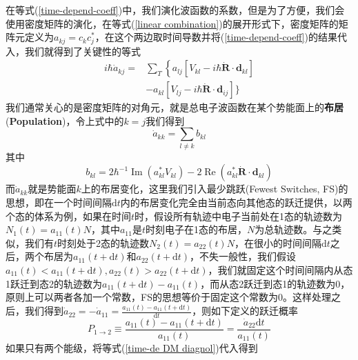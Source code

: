 \documentclass[12pt,a4paper,openany,twoside]{book}
\numberwithin{equation}{section}
\begin{document}
        在等式(\ref{time-depend-coeff})中，我们演化波函数的系数，但是为了方便，我们会使用密度矩阵的演化，在等式(\ref{linear combination})的展开形式下，密度矩阵的矩阵元定义为$a_{kj}=c_k c_j^*$，在这个两边取时间导数并将(\ref{time-depend-coeff})的结果代入，我们就得到了关键性的等式
        \begin{equation}
          \begin{aligned} i \hbar \dot{a}_{k j}=& \sum_{T}\left\{a_{l j}\left[V_{k l}-i \hbar \dot{\mathbf{R}} \cdot \mathbf{d}_{k l}\right]\right.\\ &-a_{k l}\left[V_{l j}-i \hbar \dot{\mathbf{R}} \cdot \mathbf{d}_{i j}\right] \} \end{aligned}
          \label{time-de DM}
        \end{equation}
        我们通常关心的是密度矩阵的对角元，就是总电子波函数在某个势能面上的\textbf{布居}(\textbf{Population})，令上式中的$k=j$我们得到
        \begin{equation}
          \dot{a}_{k k}=\sum_{l \neq k} b_{k l}
        \end{equation}
        其中
        \begin{equation}
          b_{k l}=2 \hbar^{-1} \operatorname{Im}\left(a_{k l}^{*} V_{k l}\right)-2 \operatorname{Re}\left(a_{k l}^{*} \dot{\mathbf{R}} \cdot \mathbf{d}_{k l}\right)
          \label{time-de DM diagnol}
        \end{equation}
        而$\dot{a}_{k k}$就是势能面$k$上的布居变化，这里我们引入最少跳跃(Fewest Switches, FS)的思想，即在一个时间间隔$\mathrm{d}t$内的布居变化完全由当前态向其他态的跃迁提供，以两个态的体系为例，如果在时间$t$时，假设所有轨迹中电子当前处在1态的轨迹数为$N_1(t)=a_{11}(t)N$，其中$a_{11}$是$t$时刻电子在1态的布居，$N$为总轨迹数。与之类似，我们有$t$时刻处于2态的轨迹数$N_2(t)=a_{22}(t)N$，在很小的时间间隔$\mathrm{d}t$之后，两个布居为$a_{11}(t+\mathrm{d}t)$和$a_{22}(t+\mathrm{d}t)$，不失一般性，我们假设$a_{11}(t)<a_{11}(t+\mathrm{d}t),a_{22}(t)>a_{22}(t+\mathrm{d}t)$，我们就固定这个时间间隔内从态1跃迁到态2的轨迹数为$a_{11}(t+\mathrm{d}t)-a_{11}(t)$，而从态2跃迁到态1的轨迹数为$0$，原则上可以两者各加一个常数，FS的思想等价于固定这个常数为$0$。这样处理之后，我们得到$\dot{a}_{22}=-\dot{a}_{11}=\frac{a_{11}(t)-a_{11}(t+\mathrm{d}t)}{\mathrm{d}t}$，则如下定义的跃迁概率
        \begin{equation}
          P_{1\rightarrow2}\equiv\frac{a_{11}(t)-a_{11}(t+\mathrm{d}t)}{a_{11}(t)}=\frac{\dot{a}_{22} \mathrm{d}t }{ a_{11}(t)}
        \end{equation}
        如果只有两个能级，将等式(\ref{time-de DM diagnol})代入得到
\end{document}

